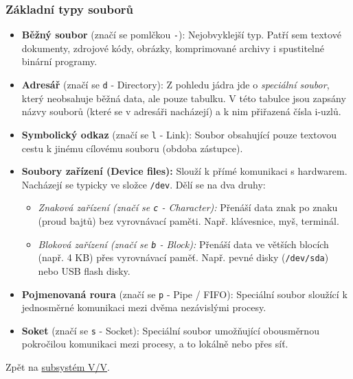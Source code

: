 \subsubsection*{Základní typy souborů}
\label{prg:typysoub}
\begin{itemize}
    \item \textbf{Běžný soubor} (značí se pomlčkou \texttt{-}): Nejobvyklejší typ. Patří sem textové dokumenty, zdrojové kódy, obrázky, komprimované archivy i spustitelné binární programy.
    \item \textbf{Adresář} (značí se \texttt{d} - Directory): Z pohledu jádra jde o \textit{speciální soubor}, který neobsahuje běžná data, ale pouze tabulku. V této tabulce jsou zapsány názvy souborů (které se v adresáři nacházejí) a k nim přiřazená čísla i-uzlů.
    \item \textbf{Symbolický odkaz} (značí se \texttt{l} - Link): Soubor obsahující pouze textovou cestu k jinému cílovému souboru (obdoba zástupce).
    \item \textbf{Soubory zařízení (Device files):} Slouží k přímé komunikaci s hardwarem. Nacházejí se typicky ve složce \texttt{/dev}. Dělí se na dva druhy:
    \begin{itemize}
        \item \textit{Znaková zařízení (značí se \texttt{c} - Character):} Přenáší data znak po znaku (proud bajtů) bez vyrovnávací paměti. Např. klávesnice, myš, terminál.
        \item \textit{Bloková zařízení (značí se \texttt{b} - Block):} Přenáší data ve větších blocích (např. 4 KB) přes vyrovnávací paměť. Např. pevné disky (\texttt{/dev/sda}) nebo USB flash disky.
    \end{itemize}
    \item \textbf{Pojmenovaná roura} (značí se \texttt{p} - Pipe / FIFO): Speciální soubor sloužící k jednosměrné komunikaci mezi dvěma nezávislými procesy.
    \item \textbf{Soket} (značí se \texttt{s} - Socket): Speciální soubor umožňující obousměrnou pokročilou komunikaci mezi procesy, a to lokálně nebo přes síť.
\end{itemize}
Zpět na \hyperref[prg:vv]{subsystém V/V}.

